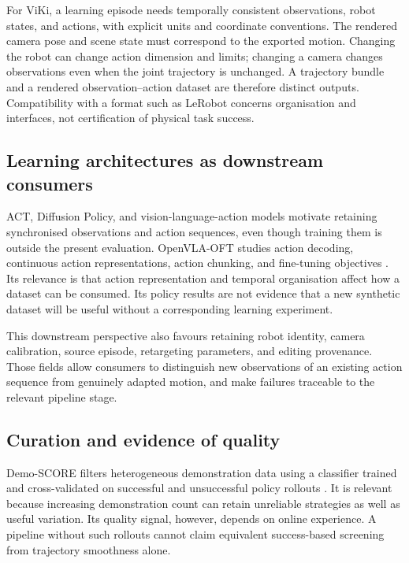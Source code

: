 For ViKi, a learning episode needs temporally consistent observations, robot
states, and actions, with explicit units and coordinate conventions. The
rendered camera pose and scene state must correspond to the exported motion.
Changing the robot can change action dimension and limits; changing a camera
changes observations even when the joint trajectory is unchanged. A trajectory
bundle and a rendered observation--action dataset are therefore distinct
outputs. Compatibility with a format such as LeRobot concerns organisation
and interfaces, not certification of physical task success.

\subsection{Learning architectures as downstream consumers}

ACT, Diffusion Policy, and vision-language-action models motivate retaining
synchronised observations and action sequences, even though training them is
outside the present evaluation. OpenVLA-OFT studies action decoding,
continuous action representations, action chunking, and fine-tuning objectives
\cite{openvlaoft}. Its relevance is that action representation and temporal
organisation affect how a dataset can be consumed. Its policy results are not
evidence that a new synthetic dataset will be useful without a corresponding
learning experiment.

This downstream perspective also favours retaining robot identity, camera
calibration, source episode, retargeting parameters, and editing provenance.
Those fields allow consumers to distinguish new observations of an existing
action sequence from genuinely adapted motion, and make failures traceable to
the relevant pipeline stage.

\subsection{Curation and evidence of quality}

Demo-SCORE filters heterogeneous demonstration data using a classifier trained
and cross-validated on successful and unsuccessful policy rollouts
\cite{demoscore}. It is relevant because increasing demonstration count can
retain unreliable strategies as well as useful variation. Its quality signal,
however, depends on online experience. A pipeline without such rollouts cannot
claim equivalent success-based screening from trajectory smoothness alone.

